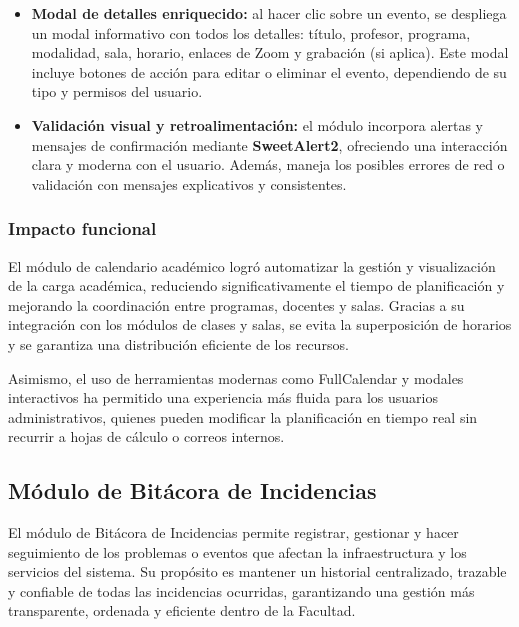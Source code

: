 \begin{itemize}
    \item \textbf{Modal de detalles enriquecido:} al hacer clic sobre un evento, se despliega un modal informativo con todos los detalles: título, profesor, programa, modalidad, sala, horario, enlaces de Zoom y grabación (si aplica). Este modal incluye botones de acción para editar o eliminar el evento, dependiendo de su tipo y permisos del usuario.
    
    \item \textbf{Validación visual y retroalimentación:} el módulo incorpora alertas y mensajes de confirmación mediante \textbf{SweetAlert2}, ofreciendo una interacción clara y moderna con el usuario. Además, maneja los posibles errores de red o validación con mensajes explicativos y consistentes.
\end{itemize}

\subsubsection{Impacto funcional}

El módulo de calendario académico logró automatizar la gestión y visualización de la carga académica, reduciendo significativamente el tiempo de planificación y mejorando la coordinación entre programas, docentes y salas. Gracias a su integración con los módulos de clases y salas, se evita la superposición de horarios y se garantiza una distribución eficiente de los recursos.

Asimismo, el uso de herramientas modernas como FullCalendar y modales interactivos ha permitido una experiencia más fluida para los usuarios administrativos, quienes pueden modificar la planificación en tiempo real sin recurrir a hojas de cálculo o correos internos.

\subsection{Módulo de Bitácora de Incidencias}

El módulo de Bitácora de Incidencias permite registrar, gestionar y hacer seguimiento de los problemas o eventos que afectan la infraestructura y los servicios del sistema. Su propósito es mantener un historial centralizado, trazable y confiable de todas las incidencias ocurridas, garantizando una gestión más transparente, ordenada y eficiente dentro de la Facultad.

